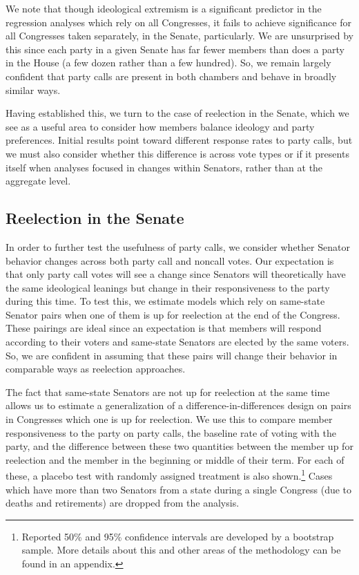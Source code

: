 \documentclass[12pt]{article}
\begin{document}
We note that though ideological extremism is a significant predictor in the regression analyses which rely on all Congresses, it fails to achieve significance for all Congresses taken separately, in the Senate, particularly. We are unsurprised by this since each party in a given Senate has far fewer members than does a party in the House (a few dozen rather than a few hundred). So, we remain largely confident that party calls are present in both chambers and behave in broadly similar ways. 

Having established this, we turn to the case of reelection in the Senate, which we see as a useful area to consider how members balance ideology and party preferences. Initial results point toward different response rates to party calls, but we must also consider whether this difference is across vote types or if it presents itself when analyses focused in changes within Senators, rather than at the aggregate level.

\subsection{Reelection in the Senate}

In order to further test the usefulness of party calls, we consider whether Senator behavior changes across both party call and noncall votes. Our expectation is that only party call votes will see a change since Senators will theoretically have the same ideological leanings but change in their responsiveness to the party during this time. To test this, we estimate models which rely on same-state Senator pairs when one of them is up for reelection at the end of the Congress. These pairings are ideal since an expectation is that members will respond according to their voters and same-state Senators are elected by the same voters. So, we are confident in assuming that these pairs will change their behavior in comparable ways as reelection approaches. 

The fact that same-state Senators are not up for reelection at the same time allows us to estimate a generalization of a difference-in-differences design on pairs in Congresses which one is up for reelection. We use this to compare member responsiveness to the party on party calls, the baseline rate of voting with the party, and the difference between these two quantities between the member up for reelection and the member in the beginning or middle of their term. For each of these, a placebo test with randomly assigned treatment is also shown.\footnote{Reported 50\% and 95\% confidence intervals are developed by a bootstrap sample. More details about this and other areas of the methodology can be found in an appendix.} Cases which have more than two Senators from a state during a single Congress (due to deaths and retirements) are dropped from the analysis.
\end{document}
